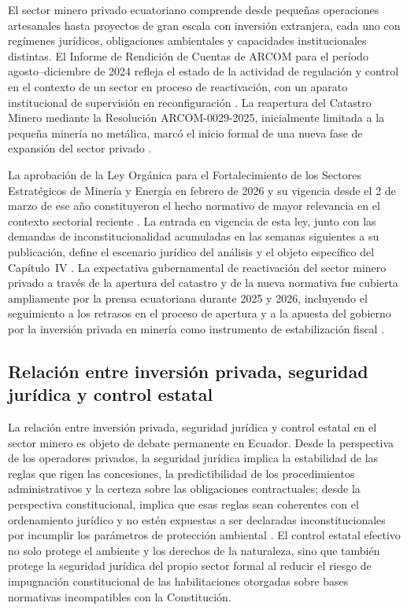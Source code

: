 El sector minero privado ecuatoriano comprende desde pequeñas operaciones artesanales hasta proyectos de gran escala con inversión extranjera, cada uno con regímenes jurídicos, obligaciones ambientales y capacidades institucionales distintas. El Informe de Rendición de Cuentas de ARCOM para el período agosto--diciembre de 2024 refleja el estado de la actividad de regulación y control en el contexto de un sector en proceso de reactivación, con un aparato institucional de supervisión en reconfiguración \parencite{arcom_rendicion_cuentas_2024}. La reapertura del Catastro Minero mediante la Resolución ARCOM-0029-2025, inicialmente limitada a la pequeña minería no metálica, marcó el inicio formal de una nueva fase de expansión del sector privado \parencite{arcom_resolucion_0029_2025}.

La aprobación de la Ley Orgánica para el Fortalecimiento de los Sectores Estratégicos de Minería y Energía en febrero de 2026 y su vigencia desde el 2 de marzo de ese año constituyeron el hecho normativo de mayor relevancia en el contexto sectorial reciente \parencite{ley_fortalecimiento_2026}. La entrada en vigencia de esta ley, junto con las demandas de inconstitucionalidad acumuladas en las semanas siguientes a su publicación, define el escenario jurídico del análisis y el objeto específico del Capítulo~IV \parencite{primicias_aprobacion_2026}. La expectativa gubernamental de reactivación del sector minero privado a través de la apertura del catastro y de la nueva normativa fue cubierta ampliamente por la prensa ecuatoriana durante 2025 y 2026, incluyendo el seguimiento a los retrasos en el proceso de apertura y a la apuesta del gobierno por la inversión privada en minería como instrumento de estabilización fiscal \parencite{lahora_capital_privado_2026,lahora_ajuste_fiscal_2026,primicias_retraso_catastro_2025,expreso_catastro_2025}.

\subsection{Relación entre inversión privada, seguridad jurídica y control estatal}

La relación entre inversión privada, seguridad jurídica y control estatal en el sector minero es objeto de debate permanente en Ecuador. Desde la perspectiva de los operadores privados, la seguridad jurídica implica la estabilidad de las reglas que rigen las concesiones, la predictibilidad de los procedimientos administrativos y la certeza sobre las obligaciones contractuales; desde la perspectiva constitucional, implica que esas reglas sean coherentes con el ordenamiento jurídico y no estén expuestas a ser declaradas inconstitucionales por incumplir los parámetros de protección ambiental \parencite{villacis_calvas_2022,cre_2008}. El control estatal efectivo no solo protege el ambiente y los derechos de la naturaleza, sino que también protege la seguridad jurídica del propio sector formal al reducir el riesgo de impugnación constitucional de las habilitaciones otorgadas sobre bases normativas incompatibles con la Constitución.

